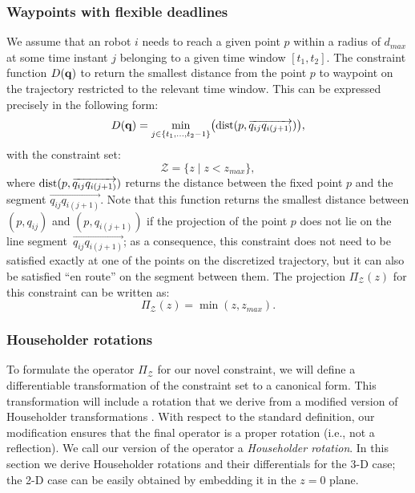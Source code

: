 \documentclass[journal]{IEEEtran}  %
\def\sZ{\mathcal{Z}}
\begin{document}
\subsubsection*{Waypoints with flexible deadlines}
We assume that an robot $i$ needs to reach a given point $p$ within a radius of $d_{max}$ at some time instant $j$ belonging to a given time window $[t_1,t_2]$. The constraint function $D(\mathbf{q})$ to return the smallest distance from the point $p$ to waypoint on the trajectory restricted to the relevant time window. This can be expressed precisely in the following form:
\begin{equation}\label{eq:waypoint_constraint_D}
D(\mathbf{q}) = \min_{j\in\{t_1,\dots,t_2-1\}}\bigl(\operatorname{dist}(p,\overrightarrow{q_{ij}q_{i(j+1)}})\bigr),
\end{equation}
with the constraint set:
\begin{equation}\label{eq:waypoint_constraint}
\sZ= \{z \mid z < z_{max} \},
\end{equation}
where $\operatorname{dist}(p,\overrightarrow{q_{ij}q_{i(j+1)}})$ returns the distance between the fixed point $p$ and the segment $\overrightarrow{q_{ij}q_{i(j+1)}}$. Note that this function returns the smallest distance between $(p,q_{ij})$ and $(p,q_{i(j+1)})$ if the projection of the point $p$ does not lie on the line segment~$\overrightarrow{q_{ij}q_{i(j+1)}}$; as a consequence, this constraint does not need to be satisfied exactly at one of the points on the discretized trajectory, but it can also be satisfied ``en route'' on the segment between them.
The projection $\Pi_\sZ(z)$ for this constraint can be written as:
\begin{equation}\label{eq:waypoint_constraint_update}
\Pi_\sZ(z) = \min(z,z_{max}).
\end{equation}


 \subsubsection{Householder rotations}\label{sec:householder}
  To formulate the operator $\Pi_\sZ$ for our novel constraint, we will define a differentiable transformation of the constraint set to a canonical form. This transformation will include a rotation that we derive from a modified version of Householder transformations \cite{householder1958unitary}. With respect to the standard definition, our modification ensures that the final operator is a proper rotation (i.e., not a reflection). We call our version of the operator a \emph{Householder rotation}. In this section we derive Householder rotations and their differentials for the 3-D case; the 2-D case can be easily obtained by embedding it in the $z=0$ plane.
\end{document}
